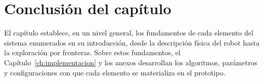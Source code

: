 \section*{Conclusión del capítulo}

El capítulo establece, en un nivel general, los fundamentos de cada elemento
del sistema enumerados en su introducción, desde la descripción física del
robot hasta la exploración por fronteras. Sobre estos fundamentos, el
Capítulo~\ref{ch:implementacion} y los anexos desarrollan los algoritmos,
parámetros y configuraciones con que cada elemento se materializa en el
prototipo.